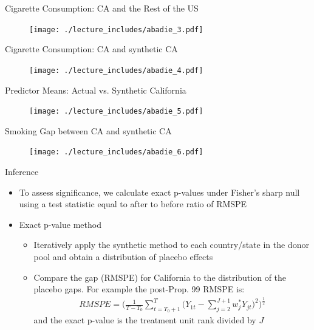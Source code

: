 \documentclass{beamer}
\begin{document}
\begin{frame}{Cigarette Consumption: CA and the Rest of the US}
	
	\begin{figure}
	\texttt{[image: ./lecture\_includes/abadie\_3.pdf]}
	\end{figure}
\end{frame}

\begin{frame}{Cigarette Consumption: CA and synthetic CA}
	
	\begin{figure}
	\texttt{[image: ./lecture\_includes/abadie\_4.pdf]}
	\end{figure}
\end{frame}

\begin{frame}{Predictor Means: Actual vs. Synthetic California}
	
	\begin{figure}
	\texttt{[image: ./lecture\_includes/abadie\_5.pdf]}
	\end{figure}
\end{frame}

\begin{frame}{Smoking Gap between CA and synthetic CA}
	
	\begin{figure}
	\texttt{[image: ./lecture\_includes/abadie\_6.pdf]}
	\end{figure}
\end{frame}

\begin{frame}{Inference}
	
	\begin{itemize}
	\item To assess significance, we calculate exact p-values under Fisher's sharp null using a test statistic equal to after to before ratio of RMSPE
	\item Exact p-value method
		\begin{itemize}
		\item Iteratively apply the synthetic method to each country/state in the donor pool and obtain a distribution of placebo effects
		\item Compare the gap (RMSPE) for California to the distribution of the placebo gaps. For example the post-Prop. 99 RMSPE is: 
			\begin{eqnarray*}
			RMSPE = \bigg(\frac{1}{T-T_0} \sum_{t=T_0+1}^T \bigg(Y_{1t} - \sum_{j=2}^{J+1} w_j^* Y_{jt}\bigg)^2 \bigg)^{\frac{1}{2}}
			\end{eqnarray*}and the exact p-value is the treatment unit rank divided by $J$
		\end{itemize}
	\end{itemize}
\end{frame}
\end{document}
